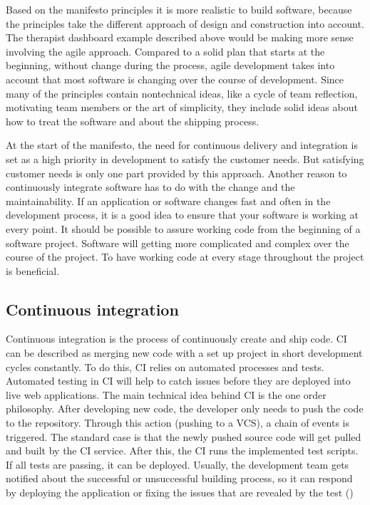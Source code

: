 Based on the manifesto principles it is more realistic to build software, because the principles take the different approach of design and construction into account. The therapist dashboard example described above would be making more sense involving the agile approach. Compared to a solid plan that starts at the beginning, without change during the process, agile development takes into account that most software is changing over the course of 
development. Since many of the principles contain nontechnical ideas, like a cycle of team reflection, motivating team members or the art of simplicity,
they include solid ideas about how to treat the software and about the shipping process.

At the start of the manifesto, the need for continuous delivery and integration is set as a high priority in development to satisfy the customer needs.
But satisfying customer needs is only one part provided by this approach. Another reason to continuously integrate software has to do with the change and the maintainability.
If an application or software changes fast and often in the development process, it is a good idea to ensure that your software is working at every point.
It should be possible to assure working code from the beginning of a software project. Software will getting more complicated and complex over the course of the project. To have working code at every stage throughout the project is beneficial.


\subsection{Continuous integration}
Continuous integration is the process of continuously create and ship code. CI can be described as merging new code with a set up project in short
development cycles constantly. To do this, CI relies on automated processes and tests. Automated testing in CI will help to catch issues before they
are deployed into live web applications. The main technical idea behind CI is
the one order philosophy. After developing new code, the developer only needs to push the code to the repository. Through this action (pushing to a VCS), a chain of events is triggered. The standard case is that the newly pushed source code will get pulled and built by the CI service. After this, the CI runs the implemented test scripts. If all tests are passing, it can be deployed. Usually, the development team gets notified about the successful or unsuccessful building process, so it can respond by deploying the application or fixing the issues that are revealed by the test (\cite{stolberg2009enabling})

